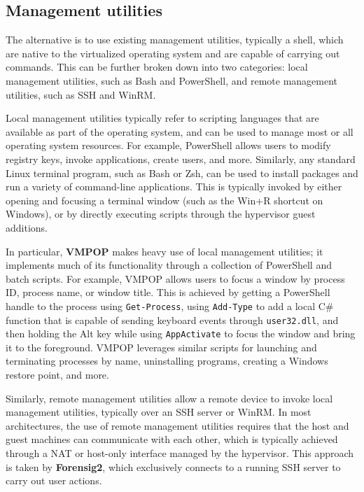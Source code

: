 \documentclass[letterpaper,12pt]{report}
\newcommand{\passthrough}[1]{#1}
\begin{document}
\subsection{Management utilities}\label{management-utilities}

The alternative is to use existing management utilities, typically a
shell, which are native to the virtualized operating system and are
capable of carrying out commands. This can be further broken down into
two categories: local management utilities, such as Bash and PowerShell,
and remote management utilities, such as SSH and WinRM.

Local management utilities typically refer to scripting languages that
are available as part of the operating system, and can be used to manage
most or all operating system resources. For example, PowerShell allows
users to modify registry keys, invoke applications, create users, and
more. Similarly, any standard Linux terminal program, such as Bash or
Zsh, can be used to install packages and run a variety of command-line
applications. This is typically invoked by either opening and focusing a
terminal window (such as the Win+R shortcut on Windows), or by directly
executing scripts through the hypervisor guest additions.

In particular, \textbf{VMPOP} makes heavy use of local management
utilities; it implements much of its functionality through a collection
of PowerShell and batch scripts. For example, VMPOP allows users to
focus a window by process ID, process name, or window title. This is
achieved by getting a PowerShell handle to the process using
\passthrough{\lstinline!Get-Process!}, using
\passthrough{\lstinline!Add-Type!} to add a local C\# function that is
capable of sending keyboard events through
\passthrough{\lstinline!user32.dll!}, and then holding the Alt key while
using \passthrough{\lstinline!AppActivate!} to focus the window and
bring it to the foreground. VMPOP leverages similar scripts for
launching and terminating processes by name, uninstalling programs,
creating a Windows restore point, and more.

Similarly, remote management utilities allow a remote device to invoke
local management utilities, typically over an SSH server or WinRM. In
most architectures, the use of remote management utilities requires that
the host and guest machines can communicate with each other, which is
typically achieved through a NAT or host-only interface managed by the
hypervisor. This approach is taken by \textbf{Forensig2}, which
exclusively connects to a running SSH server to carry out user actions.
\end{document}
